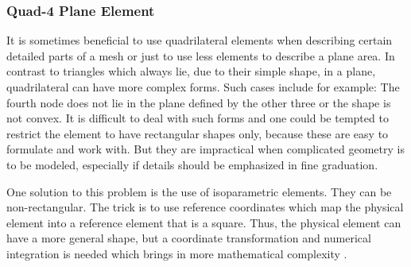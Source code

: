   
  
  \subsubsection{Quad-4 Plane Element}\label{sec:Shell-Plane-Quad}
  It is sometimes beneficial to use quadrilateral elements when describing certain detailed parts of a mesh or just to use less elements to describe a plane area. In contrast to triangles which always lie, due to their simple shape, in a plane, quadrilateral can have more complex forms. Such cases include for example: The fourth node does not lie in the plane defined by the other three or the shape is not convex. It is difficult to deal with such forms and one could be tempted to restrict the element to have rectangular shapes only, because these are easy to formulate and work with. But they are impractical when complicated geometry is to be modeled, especially if details should be emphasized in fine graduation.
    
  One solution to this problem is the use of isoparametric elements. They can be non-rectangular. The trick is to use reference coordinates which map the physical element into a reference element that is a square. Thus, the physical element can have a more general shape, but a coordinate transformation and numerical integration is needed which brings in more mathematical complexity \cite{cook2002concepts}.
  

